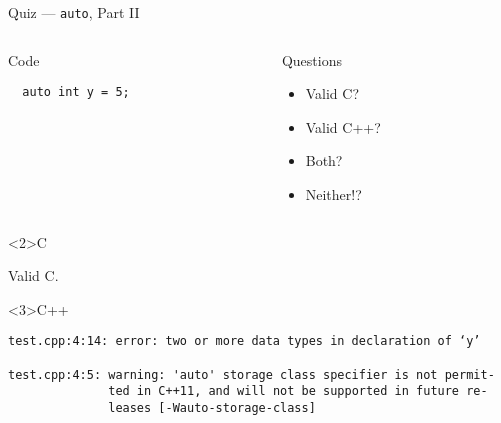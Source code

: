 \documentclass[presentation,aspectratio=169]{beamer}
\begin{document}
\begin{frame}[fragile,label={sec:org23c4234}]{Quiz — \texttt{auto}, Part II}
 \begin{columns}
\begin{column}{0.48\columnwidth}
\begin{block}{Code}
\begin{verbatim}
  auto int y = 5;
\end{verbatim}
\end{block}
\end{column}

\begin{column}{0.48\columnwidth}
\begin{block}{Questions}
\begin{itemize}
\item Valid C?
\item Valid C++?
\item Both?
\item Neither!?
\end{itemize}
\end{block}
\end{column}
\end{columns}

\begin{block}<2>{C}

Valid C.

\end{block}
\vspace{-1cm}
\begin{block}<3>{C++}
\begin{verbatim}
test.cpp:4:14: error: two or more data types in declaration of ‘y’

test.cpp:4:5: warning: 'auto' storage class specifier is not permit-
              ted in C++11, and will not be supported in future re-
              leases [-Wauto-storage-class]
\end{verbatim}
\end{block}
\end{frame}

\end{document}
